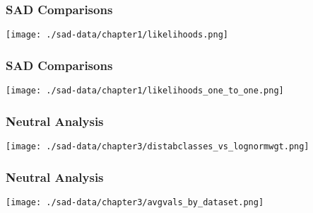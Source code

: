 \documentclass[17pt]{beamer}
\begin{document}
\begin{frame}{}
\frametitle{SAD Comparisons}
\texttt{[image: ./sad-data/chapter1/likelihoods.png]}
\end{frame}

\begin{frame}{}
\frametitle{SAD Comparisons}
\texttt{[image: ./sad-data/chapter1/likelihoods\_one\_to\_one.png]}
\end{frame}

\begin{frame}{}
\frametitle{Neutral Analysis}
\texttt{[image: ./sad-data/chapter3/distabclasses\_vs\_lognormwgt.png]}
\end{frame}

\begin{frame}{}
\frametitle{Neutral Analysis}
\texttt{[image: ./sad-data/chapter3/avgvals\_by\_dataset.png]}
\end{frame}
\end{document}

